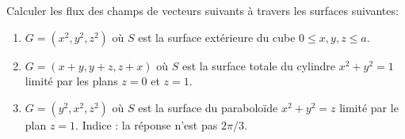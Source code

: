 
\begin{exercice}\label{exoVariete0013}

Calculer les flux des champs de vecteurs suivants à travers les surfaces suivantes: 
\begin{enumerate}
	\item $G=(x^2, y^2, z^2)$ où $S$ est la surface extérieure du cube $0\leq x,y,z\leq a$.
	\item $G=(x+y, y+z, z+x)$ où $S$ est la surface totale du cylindre $x^2+y^2=1$ limité par les plans $z=0$ et $z=1$.
	\item $G=(y^2, x^2, z^2)$ où $S$ est la surface du paraboloïde  $x^2+y^2=z$ limité par le plan $z=1$. Indice : la réponse n'est pas $2\pi/3$.
\end{enumerate}

\end{exercice}
